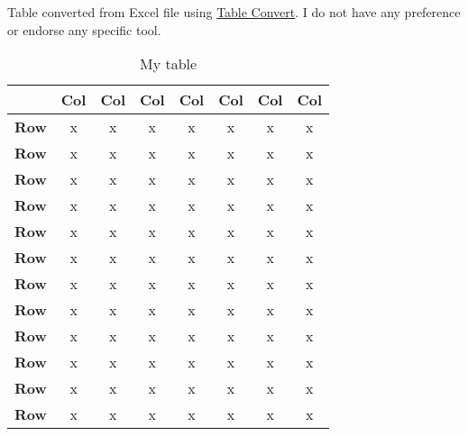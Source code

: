 Table converted from Excel file using \href{https://tableconvert.com/excel-to-latex}{Table Convert}. I do not have any preference or endorse any specific tool.

\begin{table}[!ht]
    \centering
    \caption{My table}
    \begin{tabular}{|c|ccccccc|}
    \hline
        \textbf{} & \textbf{Col} & \textbf{Col} & \textbf{Col} & \textbf{Col} & \textbf{Col} & \textbf{Col} & \textbf{Col} \\ \hline
        \textbf{Row} & x & x & x & x & x & x & x \\ 
        \textbf{Row} & x & x & x & x & x & x & x \\ 
        \textbf{Row} & x & x & x & x & x & x & x \\ 
        \textbf{Row} & x & x & x & x & x & x & x \\ 
        \textbf{Row} & x & x & x & x & x & x & x \\ 
        \textbf{Row} & x & x & x & x & x & x & x \\ 
        \textbf{Row} & x & x & x & x & x & x & x \\ 
        \textbf{Row} & x & x & x & x & x & x & x \\ 
        \textbf{Row} & x & x & x & x & x & x & x \\ 
        \textbf{Row} & x & x & x & x & x & x & x \\ 
        \textbf{Row} & x & x & x & x & x & x & x \\ 
        \textbf{Row} & x & x & x & x & x & x & x \\ \hline
    \end{tabular}
\end{table}


